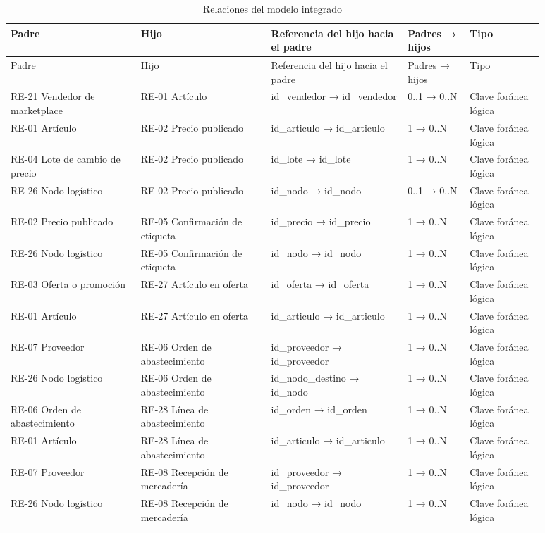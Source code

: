 \documentclass[11pt]{article}
\begin{document}
\begin{longtable}{@{}p{0.215\linewidth}p{0.215\linewidth}p{0.224\linewidth}p{0.103\linewidth}p{0.120\linewidth}@{}}
\caption{Relaciones del modelo integrado}\label{tab:relaciones}\\
\toprule Padre & Hijo & Referencia del hijo hacia el padre & Padres → hijos & Tipo \\
\midrule\endfirsthead
\toprule Padre & Hijo & Referencia del hijo hacia el padre & Padres → hijos & Tipo \\
\midrule\endhead\bottomrule\endlastfoot
RE-21 Vendedor de marketplace & RE-01 Artículo & id\_vendedor → id\_vendedor & 0..1 → 0..N & Clave foránea lógica \\
RE-01 Artículo & RE-02 Precio publicado & id\_articulo → id\_articulo & 1 → 0..N & Clave foránea lógica \\
RE-04 Lote de cambio de precio & RE-02 Precio publicado & id\_lote → id\_lote & 1 → 0..N & Clave foránea lógica \\
RE-26 Nodo logístico & RE-02 Precio publicado & id\_nodo → id\_nodo & 0..1 → 0..N & Clave foránea lógica \\
RE-02 Precio publicado & RE-05 Confirmación de etiqueta & id\_precio → id\_precio & 1 → 0..N & Clave foránea lógica \\
RE-26 Nodo logístico & RE-05 Confirmación de etiqueta & id\_nodo → id\_nodo & 1 → 0..N & Clave foránea lógica \\
RE-03 Oferta o promoción & RE-27 Artículo en oferta & id\_oferta → id\_oferta & 1 → 0..N & Clave foránea lógica \\
RE-01 Artículo & RE-27 Artículo en oferta & id\_articulo → id\_articulo & 1 → 0..N & Clave foránea lógica \\
RE-07 Proveedor & RE-06 Orden de abastecimiento & id\_proveedor → id\_proveedor & 1 → 0..N & Clave foránea lógica \\
RE-26 Nodo logístico & RE-06 Orden de abastecimiento & id\_nodo\_destino → id\_nodo & 1 → 0..N & Clave foránea lógica \\
RE-06 Orden de abastecimiento & RE-28 Línea de abastecimiento & id\_orden → id\_orden & 1 → 0..N & Clave foránea lógica \\
RE-01 Artículo & RE-28 Línea de abastecimiento & id\_articulo → id\_articulo & 1 → 0..N & Clave foránea lógica \\
RE-07 Proveedor & RE-08 Recepción de mercadería & id\_proveedor → id\_proveedor & 1 → 0..N & Clave foránea lógica \\
RE-26 Nodo logístico & RE-08 Recepción de mercadería & id\_nodo → id\_nodo & 1 → 0..N & Clave foránea lógica \\

\end{longtable}
\end{document}
